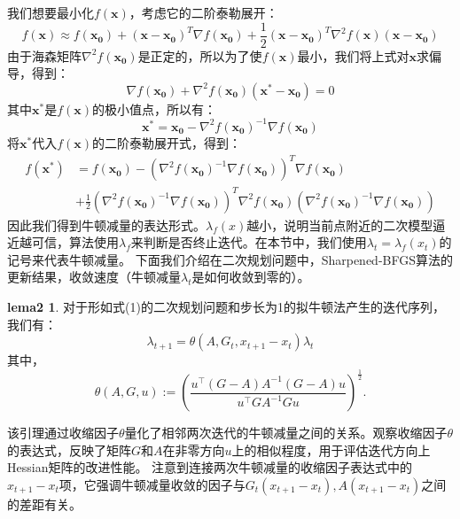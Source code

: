 \documentclass[a4paper,twoside,AutoFakeBold]{article}
\theoremstyle{definition}
\newtheorem{lema2}{{lema2}}
\begin{document}
我们想要最小化$f(\bm{x})$，考虑它的二阶泰勒展开：
\begin{equation}
    f(\bm{x})\approx f(\bm{x_0})+(\bm{x}-\bm{x_0})^T\nabla f(\bm{x_0})+\frac{1}{2}(\bm{x}-\bm{x_0})^T\nabla^2 f(\bm{x})(\bm{x}-\bm{x_0})
\end{equation}
由于海森矩阵$\nabla^2 f(\bm{x_0})$是正定的，所以为了使$f(\bm{x})$最小，我们将上式对$\bm{x}$求偏导，得到：
\begin{equation}
        \nabla f(\bm{x_0})+\nabla ^2 f(\bm{x_0})(\bm{x^{*}}-\bm{x_0})=0
\end{equation}
其中$\bm{x^{*}}$是$f(\bm{x})$的极小值点，所以有：
\begin{equation}
    \bm{x^{*}}=\bm{x_0}-\nabla ^2 f(\bm{x_0})^{-1}\nabla f(\bm{x_0})
\end{equation}
将$\bm{x^{*}}$代入$f(\bm{x})$的二阶泰勒展开式，得到：
\begin{equation}
    \begin{aligned}
    f(\bm{x^{*}})&=f(\bm{x_0})-(\nabla^2f(\bm{x_0})^{-1}\nabla f(\bm{x_0}))^T\nabla f(\bm{x_0})\\
    &+\frac{1}{2}(\nabla^2f(\bm{x_0})^{-1}\nabla f(\bm{x_0}))^T\nabla^2f(\bm{x_0})(\nabla^2f(\bm{x_0})^{-1}\nabla f(\bm{x_0}))
    \end{aligned}
\end{equation}
因此我们得到牛顿减量的表达形式。$\lambda_f(x)$越小，说明当前点附近的二次模型逼近越可信，算法使用$\lambda_f$来判断是否终止迭代。在本节中，我们使用$\lambda_t=\lambda_f(x_t)$的记号来代表牛顿减量。
下面我们介绍在二次规划问题中，Sharpened-BFGS算法的更新结果，收敛速度（牛顿减量$\lambda_t$是如何收敛到零的）。

\begin{lema2}\label{lema:theone}
    对于形如式(1)的二次规划问题和步长为1的拟牛顿法产生的迭代序列，我们有：
    \begin{equation}
        \lambda_{t+1}=\theta(A,G_t,x_{t+1}-x_t)\lambda_t
    \end{equation}
    其中，
    \begin{equation}
        \theta(A,G,u) := \left(\frac{u^\top (G - A) A^{-1} (G - A) u}{u^\top G A^{-1} G u}\right)^{\frac{1}{2}}.
    \end{equation}
\end{lema2}

该引理通过收缩因子$\theta$量化了相邻两次迭代的牛顿减量之间的关系。观察收缩因子$\theta$的表达式，反映了矩阵$G$和$A$在非零方向$u$上的相似程度，用于评估迭代方向上Hessian矩阵的改进性能。
注意到连接两次牛顿减量的收缩因子表达式中的$x_{t+1}-x_t$项，它强调牛顿减量收敛的因子与$G_t(x_{t+1}-x_t),A(x_{t+1}-x_t)$之间的差距有关。
\end{document}
